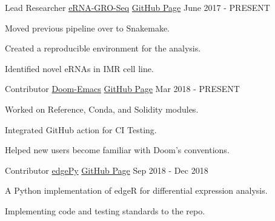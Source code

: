 
\begin{cventries}

	\cventry
	{Lead Researcher} %
	{\href{https://github.com/Emiller88/eRNA-GRO-Seq/}{eRNA-GRO-Seq}} %
	{\href{https://github.com/Emiller88/eRNA-GRO-Seq/}{GitHub Page}} %
	{June 2017 - PRESENT} %
	{
		\begin{cvitems} %
			\item {Moved previous pipeline over to Snakemake.}
			\item {Created a reproducible environment for the analysis.}
			\item {Identified novel eRNAs in IMR cell line.}
		\end{cvitems}
	}

	\cventry
	{Contributor} %
	{\href{https://github.com/hlissner/doom-emacs}{Doom-Emacs}} %
	{\href{https://github.com/hlissner/doom-emacs}{GitHub Page}} %
	{Mar 2018 - PRESENT} %
	{
		\begin{cvitems} %
			\item {Worked on Reference, Conda, and Solidity modules.}
			\item {Integrated GitHub action for CI Testing.}
			\item {Helped new users become familiar with Doom's conventions.}
		\end{cvitems}
	}

	\cventry
	{Contributor} %
	{\href{https://github.com/r-bioinformatics/edgePy}{edgePy}} %
	{\href{https://github.com/r-bioinformatics/edgePy}{GitHub Page}} %
	{Sep 2018 - Dec 2018} %
	{
		\begin{cvitems} %
			\item {A Python implementation of edgeR for differential expression analysis.}
			\item {Implementing code and testing standards to the repo.}
		\end{cvitems}
	}


\end{cventries}
